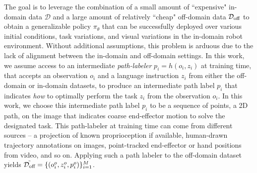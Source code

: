 The goal is to leverage the combination of a small amount of ``expensive" in-domain data $\mathcal{D}$ and a large amount of relatively ``cheap" off-domain data $\mathcal{D}_\text{off}$ to obtain a generalizable policy $\pi_\theta$ that can be successfully deployed over various initial conditions, task variations, and visual variations in the in-domain robot environment. Without additional assumptions, this problem is arduous due to the lack of alignment between the in-domain and off-domain settings. In this work, we assume access to an intermediate \emph{path-labeler} $p_i = h(o_i, z_i)$ at training time, that accepts an observation $o_i$ and a language instruction $z_i$ from either the off-domain or in-domain datasets, to produce an intermediate path label $p_i$ that indicates \emph{how} to optimally perform the task $z_i$ from the observation $o_i$. In this work, we choose this intermediate path label $p_i$ to be a sequence of points, a 2D path, on the image that indicates coarse end-effector motion to solve the designated task. 
This path-labeler at training time can come from different sources --  a projection of known proprioception if available, human-drawn trajectory annotations on images, point-tracked end-effector or hand positions from video, and so on. Applying such a path labeler to the off-domain dataset yields $\Tilde{\mathcal{D}_\text{off}} = \{(o_i^o, z_i^o, p_i^o)\}_{i=1}^M$.


